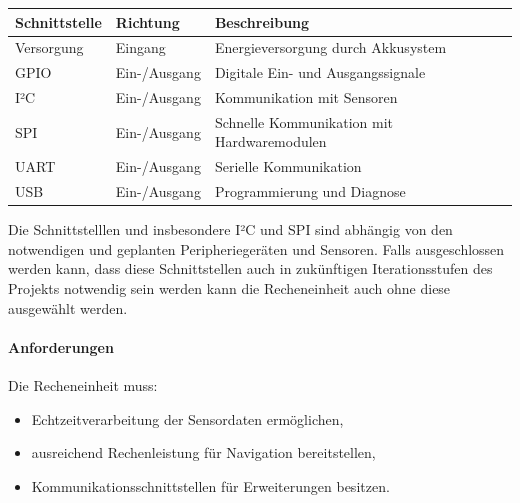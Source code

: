 \begin{longtable}[]{@{}
  >{\raggedright\arraybackslash}p{}
  >{\raggedright\arraybackslash}p{}
  >{\raggedright\arraybackslash}p{}@{}}
\toprule\noalign{}
\begin{minipage}[b]{\linewidth}\raggedright
Schnittstelle
\end{minipage} & \begin{minipage}[b]{\linewidth}\raggedright
Richtung
\end{minipage} & \begin{minipage}[b]{\linewidth}\raggedright
Beschreibung
\end{minipage} \\
\midrule\noalign{}
\endhead
\bottomrule\noalign{}
\endlastfoot
Versorgung & Eingang & Energieversorgung durch Akkusystem \\
GPIO & Ein-/Ausgang & Digitale Ein- und Ausgangssignale \\
I²C & Ein-/Ausgang & Kommunikation mit Sensoren \\
SPI & Ein-/Ausgang & Schnelle Kommunikation mit Hardwaremodulen \\
UART & Ein-/Ausgang & Serielle Kommunikation \\
USB & Ein-/Ausgang & Programmierung und Diagnose \\
\end{longtable}

Die Schnittstelllen und insbesondere I²C und SPI sind abhängig von den
notwendigen und geplanten Peripheriegeräten und Sensoren. Falls
ausgeschlossen werden kann, dass diese Schnittstellen auch in
zukünftigen Iterationsstufen des Projekts notwendig sein werden kann die
Recheneinheit auch ohne diese ausgewählt werden.

\paragraph{Anforderungen}\label{anforderungen-3}

Die Recheneinheit muss:

\begin{itemize}
\tightlist
\item
  Echtzeitverarbeitung der Sensordaten ermöglichen,
\item
  ausreichend Rechenleistung für Navigation bereitstellen,
\item
  Kommunikationsschnittstellen für Erweiterungen besitzen.
\end{itemize}

